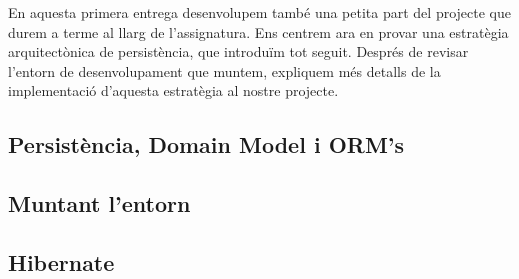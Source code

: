 En aquesta primera entrega desenvolupem també una petita part del projecte que durem a terme al llarg de l'assignatura. Ens centrem ara en provar una estratègia arquitectònica de persistència, que introduïm tot seguit. Després de revisar l'entorn de desenvolupament que muntem, expliquem més detalls de la implementació d'aquesta estratègia al nostre projecte.

\subsection{Persistència, Domain Model i ORM's}


\subsection{Muntant l'entorn}


\subsection{Hibernate}
